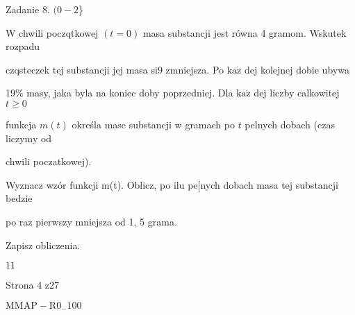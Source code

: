 \documentclass[a4paper,12pt]{article}
\begin{document}
Zadanie 8. $(0-2$\}

$\mathrm{W}$ chwili poczqtkowej $(t=0)$ masa substancji jest równa 4 gramom. Wskutek rozpadu

czqsteczek tej substancji jej masa si9 zmniejsza. Po $\mathrm{k}\mathrm{a}\dot{\mathrm{z}}$ dej kolejnej dobie ubywa

19\% masy, jaka byla na koniec doby poprzedniej. Dla $\mathrm{k}\mathrm{a}\dot{\mathrm{z}}$ dej liczby calkowitej $t\geq 0$

funkcja $m(t)$ określa mase substancji w gramach po $t$ pelnych dobach (czas liczymy od

chwili poczatkowej).

Wyznacz wzór funkcji m(t). Oblicz, po ilu pe[nych dobach masa tej substancji bedzie

po raz pierwszy mniejsza od 1, 5 grama.

Zapisz obliczenia.

$1 1$

Strona 4 z27

$\mathrm{M}\mathrm{M}\mathrm{A}\mathrm{P}-\mathrm{R}0_{-}100$
\end{document}
